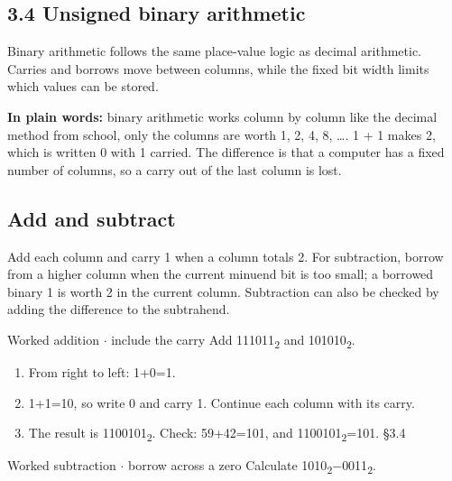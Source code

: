 \documentclass[11pt]{article}
\begin{document}
\begin{keepsection}
\section{3.4 Unsigned binary arithmetic}

Binary arithmetic follows the same place-value logic as decimal arithmetic. Carries and borrows move between columns, while the fixed bit width limits which values can be stored.

\begin{plainbox}\textbf{In plain words:} binary arithmetic works column by column like the decimal method from school, only the columns are worth 1, 2, 4, 8, …. 1 + 1 makes 2, which is written 0 with 1 carried. The difference is that a computer has a fixed number of columns, so a carry out of the last column is lost.\end{plainbox}

\begin{keepsection}
\subsection{Add and subtract}

Add each column and carry 1 when a column totals 2. For subtraction, borrow from a higher column when the current minuend bit is too small; a borrowed binary 1 is worth 2 in the current column. Subtraction can also be checked by adding the difference to the subtrahend.

\begin{workedbox}{Worked addition \ensuremath{\cdot} include the carry}
Add 111011\textsubscript{2} and 101010\textsubscript{2}.

\begin{enumerate}
\item From right to left: 1+0=1.
\item 1+1=10, so write 0 and carry 1. Continue each column with its carry.
\item The result is 1100101\textsubscript{2}. Check: 59+42=101, and 1100101\textsubscript{2}=101. \hfill{\small\color{FAUblue}§3.4}
\end{enumerate}
\end{workedbox}

\begin{workedbox}{Worked subtraction \ensuremath{\cdot} borrow across a zero}
Calculate 1010\textsubscript{2}\ensuremath{-}0011\textsubscript{2}.


\end{workedbox}
\end{keepsection}
\end{keepsection}
\end{document}
